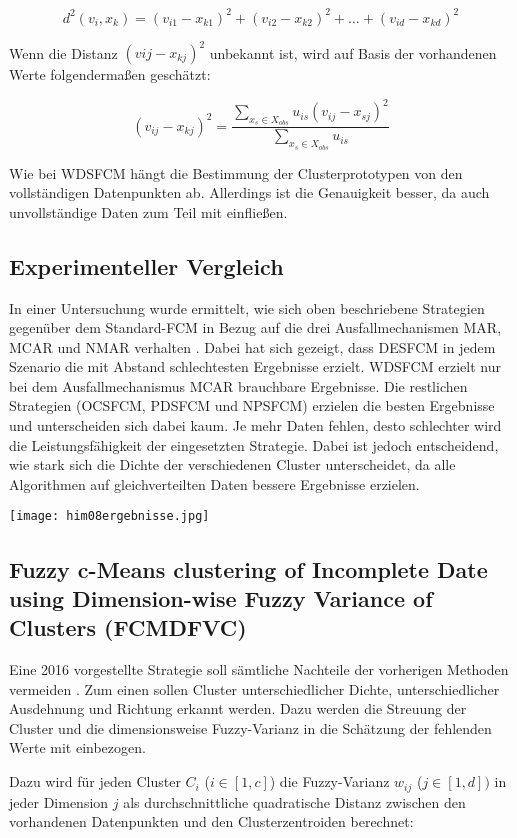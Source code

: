 \documentclass[11pt,ceqn]{book}
\begin{document}
$$d^2(v_i,x_k) = (v_{i1}-x_{k1})^2 + (v_{i2}-x_{k2})^2 + \dots + (v_{id}-x_{kd})^2$$

Wenn die Distanz $(v{ij}-x_{kj})^2$ unbekannt ist, wird auf Basis der vorhandenen Werte folgendermaßen geschätzt:

$$(v_{ij}-x_{kj})^2 = \frac{\sum\limits_{x_s \in X_{obs}} u_{is}(v_{ij}-x_{sj})^2}{\sum\limits_{x_s \in X_{obs}} u_{is}}$$

Wie bei WDSFCM hängt die Bestimmung der Clusterprototypen von den vollständigen Datenpunkten ab. Allerdings ist die Genauigkeit besser, da auch unvollständige Daten zum Teil mit einfließen.

\subsection{Experimenteller Vergleich}
In einer Untersuchung wurde ermittelt, wie sich oben beschriebene Strategien gegenüber dem Standard-FCM in Bezug auf die drei Ausfallmechanismen MAR, MCAR und NMAR verhalten \cite{mvresult}. Dabei hat sich gezeigt, dass DESFCM in jedem Szenario die mit Abstand schlechtesten Ergebnisse erzielt. WDSFCM erzielt nur bei dem Ausfallmechanismus MCAR brauchbare Ergebnisse. Die restlichen Strategien (OCSFCM, PDSFCM und NPSFCM) erzielen die besten Ergebnisse und unterscheiden sich dabei kaum. Je mehr Daten fehlen, desto schlechter wird die Leistungsfähigkeit der eingesetzten Strategie. Dabei ist jedoch entscheidend, wie stark sich die Dichte der verschiedenen Cluster unterscheidet, da alle Algorithmen auf gleichverteilten Daten bessere Ergebnisse erzielen.
\begin{minipage}{1\textwidth}
\texttt{[image: him08ergebnisse.jpg]}
\end{minipage}

\subsection{Fuzzy c-Means clustering of Incomplete Date using
Dimension-wise Fuzzy Variance of Clusters (FCMDFVC)}

Eine 2016 vorgestellte Strategie soll sämtliche Nachteile der vorherigen Methoden vermeiden \cite{fcmdfvc}. Zum einen sollen Cluster unterschiedlicher Dichte, unterschiedlicher Ausdehnung und Richtung erkannt werden. Dazu werden die Streuung der Cluster und die dimensionsweise Fuzzy-Varianz in die Schätzung der fehlenden Werte mit einbezogen. 

Dazu wird für jeden Cluster $C_i$ ($i\in \left[1,c \right]$) die Fuzzy-Varianz $w_{ij}$ ($j\in\left[1,d \right])$ in jeder Dimension $j$ als durchschnittliche quadratische Distanz zwischen den vorhandenen Datenpunkten und den Clusterzentroiden berechnet:
\end{document}
